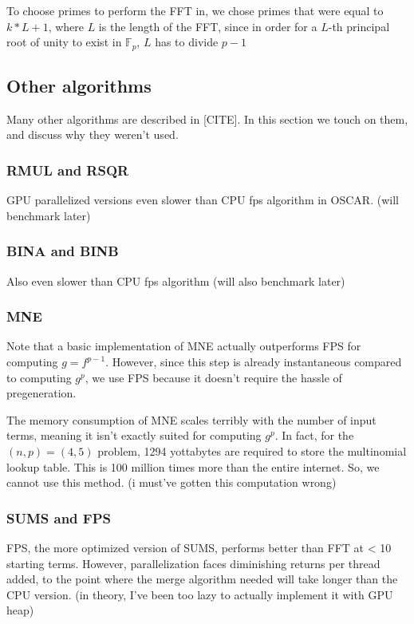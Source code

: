 To choose primes to perform the FFT in, we chose primes that were equal to $k * L + 1$, where $L$ is the length of the FFT, since in order for a $L$-th principal root of unity to exist in $\mathbb{F}_p$, $L$ has to divide $p - 1$

\subsection{Other algorithms}
Many other algorithms are described in [CITE]. In this section we touch on them, and discuss why they
weren't used.

\subsubsection{RMUL and RSQR}
GPU parallelized versions even slower than CPU fps algorithm in OSCAR. (will benchmark later)

\subsubsection{BINA and BINB}
Also even slower than CPU fps algorithm (will also benchmark later)

\subsubsection{MNE}
Note that a basic implementation of MNE actually outperforms FPS for computing $g = f^{p - 1}$. However, 
since this step is already instantaneous compared to computing $g ^ p$, we use FPS because it doesn't require 
the hassle of pregeneration.

The memory consumption of MNE scales terribly with the number of input terms, meaning it isn't exactly suited for computing $g ^ p$. In fact, for the $(n, p) = (4, 5)$ problem, 1294 yottabytes are required to store the multinomial lookup table. This is 100 million times more than the entire internet. So, we cannot use this method. (i must've gotten this computation wrong)


\subsubsection{SUMS and FPS}
FPS, the more optimized version of SUMS, performs better than FFT at < 10 starting terms. However,
parallelization faces diminishing returns per thread added, to the point where the merge algorithm needed
will take longer than the CPU version. (in theory, I've been too lazy to actually implement it with GPU 
heap)
